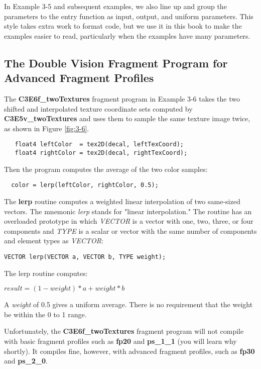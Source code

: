 \documentclass[../main.tex]{subfiles}
\begin{document}
In Example 3-5 and subsequent examples, we also line up and group the parameters to the entry function as input, output, and uniform parameters. This style takes extra work to format code, but we use it in this book to make the examples easier to read, particularly when the examples have many parameters.

\subsection*{The Double Vision Fragment Program for Advanced Fragment Profiles}

The \textbf{C3E6f_twoTextures} fragment program in Example 3-6 takes the two shifted and interpolated texture coordinate sets computed by \textbf{C3E5v_twoTextures} and uses them to sample the same texture image twice, as shown in Figure \ref{fig:3-6}.

\FloatBarrier
\begin{lstlisting}   
   float4 leftColor  = tex2D(decal, leftTexCoord);
   float4 rightColor = tex2D(decal, rightTexCoord);
\end{lstlisting}
\FloatBarrier

Then the program computes the average of the two color samples:

\FloatBarrier
\begin{lstlisting}
  color = lerp(leftColor, rightColor, 0.5);
\end{lstlisting}
\FloatBarrier

The \textbf{lerp} routine computes a weighted linear interpolation of two same-sized vectors. The mnemonic \textit{lerp} stands for "linear interpolation." The routine has an overloaded prototype in which \textit{VECTOR} is a vector with one, two, three, or four components and \textit{TYPE} is a scalar or vector with the same number of components and element types as \textit{VECTOR}:

\FloatBarrier
\begin{lstlisting}
VECTOR lerp(VECTOR a, VECTOR b, TYPE weight);
\end{lstlisting}
\FloatBarrier

The lerp routine computes:

\FloatBarrier
$
result = (1 - weight) * a + weight * b
$
\FloatBarrier

A \textit{weight} of 0.5 gives a uniform average. There is no requirement that the weight be within the 0 to 1 range.

Unfortunately, the \textbf{C3E6f_twoTextures} fragment program will not compile with basic fragment profiles such as \textbf{fp20} and \textbf{ps_1_1} (you will learn why shortly). It compiles fine, however, with advanced fragment profiles, such as \textbf{fp30} and \textbf{ps_2_0}.
\end{document}
